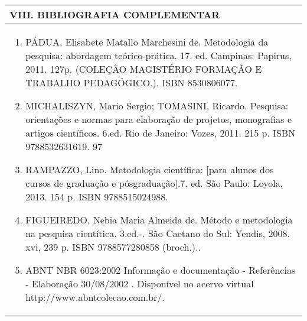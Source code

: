 \documentclass[12pt]{article}
\begin{document}
\begin{longtable}{|L{1.025\textwidth}|} \hline
%
{\bf VIII. BIBLIOGRAFIA COMPLEMENTAR} \\ \hline
\begin{enumerate}
\item PÁDUA, Elisabete Matallo Marchesini de. Metodologia da pesquisa: abordagem teórico-prática. 17. ed. Campinas: Papirus, 2011. 127p. (COLEÇÃO MAGISTÉRIO FORMAÇÃO E TRABALHO PEDAGÓGICO.). ISBN 8530806077. 
\item MICHALISZYN, Mario Sergio; TOMASINI, Ricardo. Pesquisa: orientações e normas para elaboração de projetos, monografias e artigos científicos. 6.ed. Rio de Janeiro: Vozes, 2011. 215 p. ISBN 9788532631619. 97 
\item RAMPAZZO, Lino. Metodologia científica: [para alunos dos cursos de graduação e pósgraduação].7. ed. São Paulo: Loyola, 2013. 154 p. ISBN 9788515024988. 
\item FIGUEIREDO, Nebia Maria Almeida de. Método e metodologia na pesquisa cientítica. 3.ed.-. São Caetano do Sul: Yendis, 2008. xvi, 239 p. ISBN 9788577280858 (broch.).. 
\item ABNT NBR 6023:2002 Informação e documentação - Referências - Elaboração 30/08/2002 . Disponível no acervo virtual http://www.abntcolecao.com.br/.
\end{enumerate}
 \\ \hline
\end{longtable}



\end{document}
